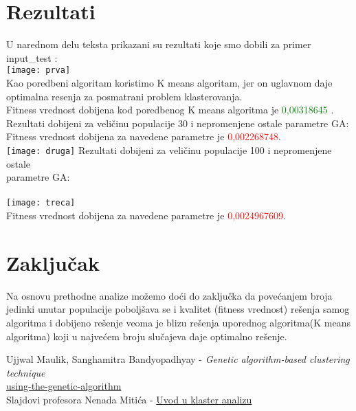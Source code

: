 \documentclass[]{article}
\begin{document}
	\section{Rezultati}
	U narednom delu teksta  prikazani su rezultati koje smo dobili za primer input\_test :\\
	\texttt{[image: prva]}
	\vspace{0.5cm}\\Kao poredbeni algoritam koristimo K means algoritam, jer on uglavnom daje optimalna resenja za posmatrani problem klasterovanja.	\vspace{0.5cm}\\
	Fitness vrednost dobijena kod poredbenog K means algoritma je \textcolor{green}{0,00318645} . \newpage
	Rezultati dobijeni za veličinu populacije 30 i nepromenjene ostale parametre GA:\vspace{0.5cm}\\
	Fitness vrednost dobijena za navedene parametre je \textcolor{red}{0,002268748}.\\
	\texttt{[image: druga]}
	\newpage
	Rezultati dobijeni za veličinu populacije 100  i nepromenjene ostale \\ parametre GA:\\ \\
	\texttt{[image: treca]}
	\vspace{0.5cm}\\Fitness vrednost dobijena za navedene parametre je \textcolor{red}{0,0024967609}. \\
	
	\section{Zaklju\v{c}ak}
	Na osnovu prethodne analize možemo doći do zaključka da povećanjem broja jedinki unutar populacije poboljšava se i kvalitet (fitness vrednost) rešenja samog algoritma i dobijeno rešenje veoma je blizu rešenja uporednog algoritma(K means algoritma)  koji  u najvećem broju slučajeva daje optimalno rešenje.
	
	\newpage
	
	\begin{thebibliography}{9} 
		Ujjwal Maulik, Sanghamitra Bandyopadhyay - 
		\textit{Genetic algorithm-based clustering technique}\\
		\href{https://blog.paperspace.com/clustering-using-the-genetic-algorithm/}{using-the-genetic-algorithm}\\
		Slajdovi profesora Nenada Mitića - 
		\href{http://poincare.matf.bg.ac.rs/~nenad/ip1/13.uvod_u_klaster_analizu.pdf}{Uvod u klaster analizu}
		
	\end{thebibliography}
	
	
	
	
\end{document}
